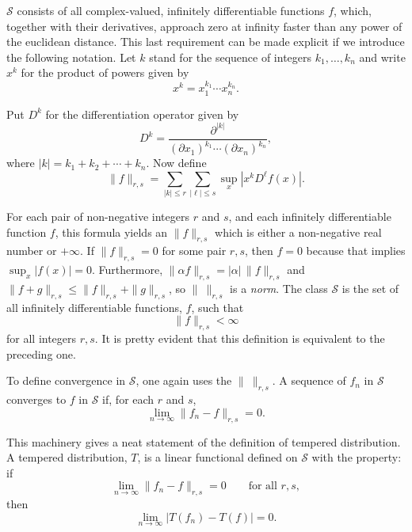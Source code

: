 $\mathcal{S}$ consists of all complex-valued, infinitely differentiable
functions $f$, which, together with their derivatives, approach zero at
infinity faster than any power of the euclidean distance. This last
requirement can be made explicit if we introduce the following notation. Let
$k$ stand for the sequence of integers $k_1,\ldots,k_n$ and write $x^k$ for the
product of powers given by
\begin{equation}
  x^k=x_1^{k_1}\cdots x_n^{k_n}.
\tag{2-4}\label{eq:ch2-multiindex}
\end{equation}

Put $D^k$ for the differentiation operator given by
\begin{equation}
  D^k=\frac{\partial^{|k|}}
    {(\partial x_1)^{k_1}\cdots(\partial x_n)^{k_n}},
\tag{2-5}\label{eq:ch2-derivative-multiindex}
\end{equation}
where $|k|=k_1+k_2+\cdots+k_n$. Now define
\begin{equation}
  \|f\|_{r,s}=\sum_{|k|\le r}\sum_{|\ell|\le s}
    \sup_x\left|x^kD^\ell f(x)\right|.
\tag{2-6}\label{eq:ch2-seminorm}
\end{equation}

For each pair of non-negative integers $r$ and $s$, and each infinitely
differentiable function $f$, this formula yields an $\|f\|_{r,s}$ which is
either a non-negative real number or $+\infty$. If $\|f\|_{r,s}=0$ for some
pair $r,s$, then $f=0$ because that implies $\sup_x|f(x)|=0$. Furthermore,
$\|\alpha f\|_{r,s}=|\alpha|\,\|f\|_{r,s}$ and
$\|f+g\|_{r,s}\le\|f\|_{r,s}+\|g\|_{r,s}$, so $\|\ \|_{r,s}$ is a
\emph{norm}. The class $\mathcal{S}$ is the set of all infinitely
differentiable functions, $f$, such that
\begin{equation*}
  \|f\|_{r,s}<\infty
\end{equation*}
for all integers $r,s$. It is pretty evident that this definition is
equivalent to the preceding one.

To define convergence in $\mathcal{S}$, one again uses the $\|\ \|_{r,s}$. A
sequence of $f_n$ in $\mathcal{S}$ converges to $f$ in $\mathcal{S}$ if, for
each $r$ and $s$,
\begin{equation}
  \lim_{n\to\infty}\|f_n-f\|_{r,s}=0.
\tag{2-7}\label{eq:ch2-convergence-s}
\end{equation}

This machinery gives a neat statement of the definition of tempered
distribution. A tempered distribution, $T$, is a linear functional defined on
$\mathcal{S}$ with the property: if
\begin{equation*}
  \lim_{n\to\infty}\|f_n-f\|_{r,s}=0\qquad\text{for all }r,s,
\end{equation*}
then
\begin{equation}
  \lim_{n\to\infty}|T(f_n)-T(f)|=0.
\tag{2-8}\label{eq:ch2-tempered-continuity}
\end{equation}

